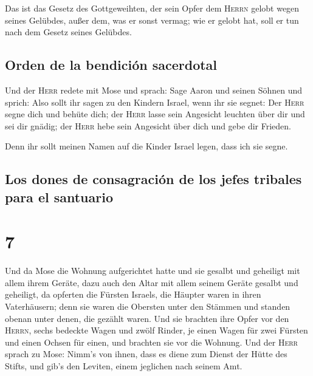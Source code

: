  Das ist das Gesetz des Gottgeweihten, der sein Opfer dem
\textsc{Herrn} gelobt wegen seines Gelübdes, außer dem, was er sonst
vermag; wie er gelobt hat, soll er tun nach dem Gesetz seines Gelübdes.

\hypertarget{orden-de-la-bendiciuxf3n-sacerdotal}{%
\subsection{Orden de la bendición
sacerdotal}\label{orden-de-la-bendiciuxf3n-sacerdotal}}

 Und der \textsc{Herr} redete mit Mose und sprach:
 Sage Aaron und seinen Söhnen und sprich: Also sollt ihr
sagen zu den Kindern Israel, wenn ihr sie segnet:  Der
\textsc{Herr} segne dich und behüte dich;  der
\textsc{Herr} lasse sein Angesicht leuchten über dir und sei dir gnädig;
 der \textsc{Herr} hebe sein Angesicht über dich und gebe
dir Frieden.

 Denn ihr sollt meinen Namen auf die Kinder Israel legen,
dass ich sie segne.

\hypertarget{los-dones-de-consagraciuxf3n-de-los-jefes-tribales-para-el-santuario}{%
\subsection{Los dones de consagración de los jefes tribales para el
santuario}\label{los-dones-de-consagraciuxf3n-de-los-jefes-tribales-para-el-santuario}}

\hypertarget{section-6}{%
\section{7}\label{section-6}}

 Und da Mose die Wohnung aufgerichtet hatte und sie
gesalbt und geheiligt mit allem ihrem Geräte, dazu auch den Altar mit
allem seinem Geräte gesalbt und geheiligt,  da opferten
die Fürsten Israels, die Häupter waren in ihren Vaterhäusern; denn sie
waren die Obersten unter den Stämmen und standen obenan unter denen, die
gezählt waren.  Und sie brachten ihre Opfer vor den
\textsc{Herrn}, sechs bedeckte Wagen und zwölf Rinder, je einen Wagen
für zwei Fürsten und einen Ochsen für einen, und brachten sie vor die
Wohnung.  Und der \textsc{Herr} sprach zu Mose:
 Nimm's von ihnen, dass es diene zum Dienst der Hütte des
Stifts, und gib's den Leviten, einem jeglichen nach seinem Amt.

